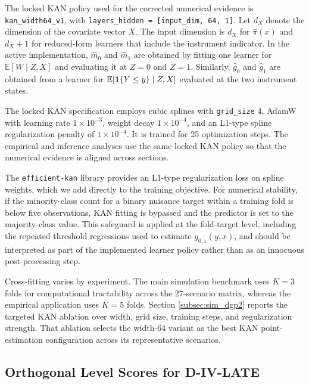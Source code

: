 \documentclass[final,3p,fleqn, 10pt]{elsarticle}
\begin{document}
The locked KAN policy used for the corrected numerical evidence is \texttt{kan\_width64\_v1}, with \texttt{layers\_hidden = [input\_dim, 64, 1]}. Let $d_X$ denote the dimension of the covariate vector $X$. The input dimension is $d_X$ for $\hat{\pi}(x)$ and $d_X+1$ for reduced-form learners that include the instrument indicator. In the active implementation, $\hat{m}_0$ and $\hat{m}_1$ are obtained by fitting one learner for $\mathbb{E}[W \mid Z, X]$ and evaluating it at $Z=0$ and $Z=1$. Similarly, $\hat{g}_0$ and $\hat{g}_1$ are obtained from a learner for $\mathbb{E}[\mathbf{1}\{Y \le y\} \mid Z, X]$ evaluated at the two instrument states.

The locked KAN specification employs cubic splines with \texttt{grid\_size} 4, AdamW with learning rate $1 \times 10^{-3}$, weight decay $1 \times 10^{-4}$, and an L1-type spline regularization penalty of $1 \times 10^{-4}$. It is trained for 25 optimization steps. The empirical and inference analyses use the same locked KAN policy so that the numerical evidence is aligned across sections.

The \texttt{efficient-kan} library provides an L1-type regularization loss on spline weights, which we add directly to the training objective. For numerical stability, if the minority-class count for a binary nuisance target within a training fold is below five observations, KAN fitting is bypassed and the predictor is set to the majority-class value. This safeguard is applied at the fold-target level, including the repeated threshold regressions used to estimate $g_{0,z}(y,x)$, and should be interpreted as part of the implemented learner policy rather than as an innocuous post-processing step.

Cross-fitting varies by experiment. The main simulation benchmark uses $K=3$ folds for computational tractability across the 27-scenario matrix, whereas the empirical application uses $K=5$ folds. Section \ref{subsec:sim_dgp2} reports the targeted KAN ablation over width, grid size, training steps, and regularization strength. That ablation selects the width-64 variant as the best KAN point-estimation configuration across its representative scenarios.

\subsection{Orthogonal Level Scores for D-IV-LATE}
\end{document}
